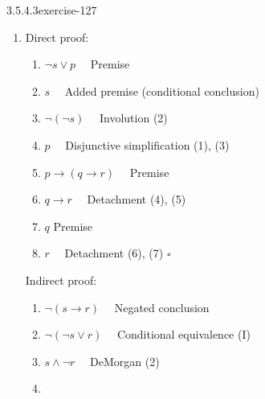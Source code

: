 \documentclass[twoside,10pt,]{book}
\numberwithin{equation}{section}
\begin{document}
\begin{divisionsolution}{3.5.4.3}{}{exercise-127}
\begin{enumerate}[label=(\alph*)]
\begin{enumerate}[label=(\arabic*)]
\item\hypertarget{li-649}{}\hypertarget{p-1167}{}%
\(r\to s\)%
\item\hypertarget{li-650}{}\hypertarget{p-1168}{}%
\(\neg r\)%
\item\hypertarget{li-651}{}\hypertarget{p-1169}{}%
\(p\to r\)%
\item\hypertarget{li-652}{}\hypertarget{p-1170}{}%
\(r\)%
\item\hypertarget{li-653}{}\hypertarget{p-1171}{}%
\(0\) \(\quad \square\)%
\end{enumerate}
%
\item\hypertarget{li-654}{}\hypertarget{p-1172}{}%
Direct proof:%
\par
\hypertarget{p-1173}{}%
%
\begin{enumerate}[label=(\arabic*)]
\item\hypertarget{li-655}{}\hypertarget{p-1174}{}%
\(\neg s\lor p\quad \)   Premise%
\item\hypertarget{li-656}{}\hypertarget{p-1175}{}%
\(s\quad \)    Added premise (conditional conclusion)%
\item\hypertarget{li-657}{}\hypertarget{p-1176}{}%
\(\neg (\neg s)\quad \)   Involution (2)%
\item\hypertarget{li-658}{}\hypertarget{p-1177}{}%
\(p  \quad \) Disjunctive simplification (1), (3)%
\item\hypertarget{li-659}{}\hypertarget{p-1178}{}%
\(p\to (q\to r)\quad \)    Premise%
\item\hypertarget{li-660}{}\hypertarget{p-1179}{}%
\(q\to r\quad \)    Detachment (4), (5)%
\item\hypertarget{li-661}{}\hypertarget{p-1180}{}%
\(q\)  Premise%
\item\hypertarget{li-662}{}\hypertarget{p-1181}{}%
\(r\quad \)     Detachment (6), (7) \(\square\)%
\end{enumerate}
%
\par
\hypertarget{p-1182}{}%
Indirect proof:%
\par
\hypertarget{p-1183}{}%
%
\begin{enumerate}[label=(\arabic*)]
\item\hypertarget{li-663}{}\hypertarget{p-1184}{}%
\(\neg (s\to r)\quad \)    Negated conclusion%
\item\hypertarget{li-664}{}\hypertarget{p-1185}{}%
\(\neg (\neg s\lor r)\quad \)  Conditional equivalence (I)%
\item\hypertarget{li-665}{}\hypertarget{p-1186}{}%
\(s\land \neg r\quad \)   DeMorgan (2)%
\item\hypertarget{li-666}{}\hypertarget{p-1187}{}%

\end{enumerate}
\end{enumerate}
\end{divisionsolution}
\end{document}
